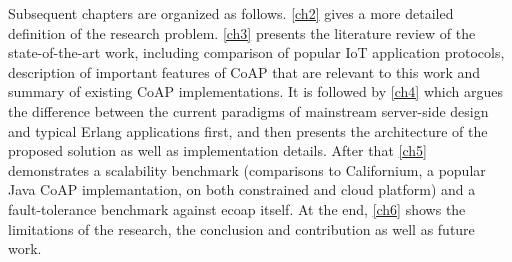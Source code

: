 Subsequent chapters are organized as follows. \autoref{ch2} gives a more detailed definition of the research problem. \autoref{ch3} presents the literature review of the state-of-the-art work, including comparison of popular IoT application protocols, description of important features of CoAP that are relevant to this work and summary of existing CoAP implementations. It is followed by \autoref{ch4} which argues the difference between the current paradigms of mainstream server-side design and typical Erlang applications first, and then presents the architecture of the proposed solution as well as implementation details. After that \autoref{ch5} demonstrates a scalability benchmark (comparisons to Californium, a popular Java CoAP implemantation, on both constrained and cloud platform) and a fault-tolerance benchmark 
against ecoap itself. At the end, \autoref{ch6} shows the limitations of the research, the conclusion and contribution as well as future work.





